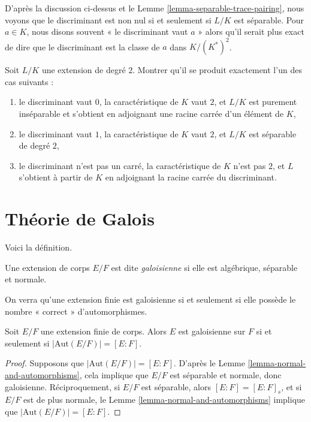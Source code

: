 \noindent
D'après la discussion ci-dessus et le Lemme \ref{lemma-separable-trace-pairing},
nous voyons que le discriminant est non nul si et seulement
si $L/K$ est séparable. Pour $a \in K$, nous disons souvent
« le discriminant vaut $a$ » alors qu'il serait plus exact
de dire que le discriminant est la classe de $a$ dans $K/(K^*)^2$.

\begin{exercise}
\label{exercise-quadratic-discriminant}
Soit $L/K$ une extension de degré $2$. Montrer qu'il se produit exactement
l'un des cas suivants :
\begin{enumerate}
\item le discriminant vaut $0$, la caractéristique de $K$ vaut $2$,
et $L/K$ est purement inséparable et s'obtient en adjoignant une racine carrée
d'un élément de $K$,
\item le discriminant vaut $1$, la caractéristique de $K$ vaut $2$, et
$L/K$ est séparable de degré $2$,
\item le discriminant n'est pas un carré, la caractéristique de $K$
n'est pas $2$, et $L$ s'obtient à partir de $K$ en adjoignant la racine carrée
du discriminant.
\end{enumerate}
\end{exercise}







\section{Théorie de Galois}
\label{section-galois-theory}

\noindent
Voici la définition.

\begin{definition}
\label{definition-galois}
Une extension de corps $E/F$ est dite {\it galoisienne} si elle est algébrique,
séparable et normale.
\end{definition}

\noindent
On verra qu'une extension finie est galoisienne si et seulement si elle possède
le nombre « correct » d'automorphismes.

\begin{lemma}
\label{lemma-finite-Galois}
Soit $E/F$ une extension finie de corps. Alors $E$ est galoisienne sur $F$
si et seulement si $|\text{Aut}(E/F)| = [E : F]$.
\end{lemma}

\begin{proof}
Supposons que $|\text{Aut}(E/F)| = [E : F]$. D'après le
Lemme \ref{lemma-normal-and-automorphisms}, cela implique
que $E/F$ est séparable et normale, donc galoisienne.
Réciproquement, si $E/F$ est séparable, alors $[E : F] = [E : F]_s$, et
si $E/F$ est de plus normale, le
Lemme \ref{lemma-normal-and-automorphisms} implique que
$|\text{Aut}(E/F)| = [E : F]$.
\end{proof}

